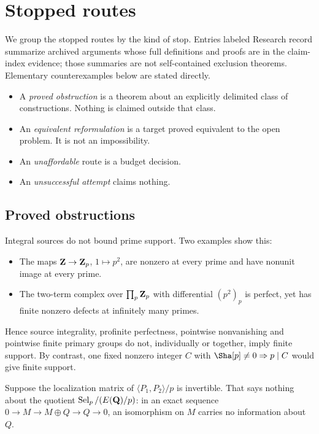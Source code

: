\section{Stopped routes}\label{sec:obstructions}

We group the stopped routes by the kind of stop. Entries labeled Research record summarize archived arguments whose full definitions and proofs are in the claim-index evidence; those summaries are not self-contained exclusion theorems. Elementary counterexamples below are stated directly.
\begin{itemize}[leftmargin=*]
\item A \emph{proved obstruction} is a theorem about an explicitly delimited class of constructions. Nothing is claimed outside that class.
\item An \emph{equivalent reformulation} is a target proved equivalent to the open problem. It is not an impossibility.
\item An \emph{unaffordable} route is a budget decision.
\item An \emph{unsuccessful attempt} claims nothing.
\end{itemize}

\subsection{Proved obstructions}
\begin{obstruction}\label{obs:support}
Integral sources do not bound prime support. Two examples show this:
\begin{itemize}[leftmargin=*]
\item The maps $\mathbf{Z}\to\mathbf{Z}_p$, $1\mapsto p^2$, are nonzero at every prime and have nonunit image at every prime.
\item The two-term complex over $\prod_p\mathbf{Z}_p$ with differential $(p^2)_p$ is perfect, yet has finite nonzero defects at infinitely many primes.
\end{itemize}
Hence source integrality, profinite perfectness, pointwise nonvanishing and pointwise finite primary groups do not, individually or together, imply finite support. By contrast, one fixed nonzero integer $C$ with $\Sha[p]\neq0\Rightarrow p\mid C$ would give finite support.
\end{obstruction}

\begin{obstruction}\label{obs:det}
Suppose the localization matrix of $\langle P_1,P_2\rangle/p$ is invertible. That says nothing about the quotient $\operatorname{Sel}_p/(E(\mathbf{Q})/p)$: in an exact sequence $0\to M\to M\oplus Q\to Q\to0$, an isomorphism on $M$ carries no information about $Q$.
\end{obstruction}

